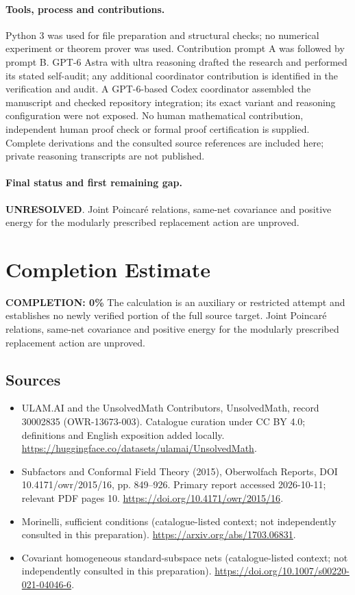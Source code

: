 \documentclass[11pt]{article}
\begin{document}
\paragraph{Tools, process and contributions.}
Python 3 was used for file preparation and structural checks; no numerical experiment or theorem prover was used. Contribution prompt A was followed by prompt B. GPT-6 Astra with ultra reasoning drafted the research and performed its stated self-audit; any additional coordinator contribution is identified in the verification and audit. A GPT-6-based Codex coordinator assembled the manuscript and checked repository integration; its exact variant and reasoning configuration were not exposed. No human mathematical contribution, independent human proof check or formal proof certification is supplied. Complete derivations and the consulted source references are included here; private reasoning transcripts are not published.

\paragraph{Final status and first remaining gap.}
\textbf{UNRESOLVED}. Joint Poincaré relations, same-net covariance and positive energy for the modularly prescribed replacement action are unproved.

\section{Completion Estimate}
\noindent\textbf{COMPLETION: 0\%}
The calculation is an auxiliary or restricted attempt and establishes no newly verified portion of the full source target. Joint Poincaré relations, same-net covariance and positive energy for the modularly prescribed replacement action are unproved.

\subsection{Sources}
\begin{itemize}
\item[\hypertarget{source:30002835:1}{S1}] ULAM.AI and the UnsolvedMath Contributors, UnsolvedMath, record 30002835 (OWR-13673-003). Catalogue curation under CC BY 4.0; definitions and English exposition added locally.
\url{https://huggingface.co/datasets/ulamai/UnsolvedMath}.
\item[\hypertarget{source:30002835:2}{S2}] Subfactors and Conformal Field Theory (2015), Oberwolfach Reports, DOI 10.4171/owr/2015/16, pp. 849--926. Primary report accessed 2026-10-11; relevant PDF pages 10.
\url{https://doi.org/10.4171/owr/2015/16}.
\item[\hypertarget{source:30002835:3}{S3}] Morinelli, sufficient conditions (catalogue-listed context; not independently consulted in this preparation).
\url{https://arxiv.org/abs/1703.06831}.
\item[\hypertarget{source:30002835:4}{S4}] Covariant homogeneous standard-subspace nets (catalogue-listed context; not independently consulted in this preparation).
\url{https://doi.org/10.1007/s00220-021-04046-6}.
\end{itemize}
\label{end:30002835}
\end{document}
